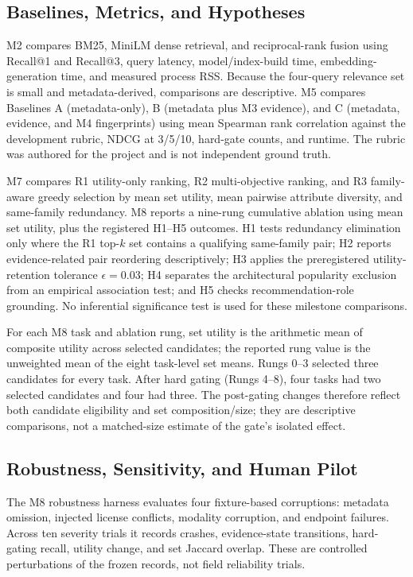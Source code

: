 \documentclass[conference]{IEEEtran}
\begin{document}
\subsection{Baselines, Metrics, and Hypotheses}
M2 compares BM25, MiniLM dense retrieval, and reciprocal-rank fusion using Recall@1 and Recall@3, query latency, model/index-build time, embedding-generation time, and measured process RSS. Because the four-query relevance set is small and metadata-derived, comparisons are descriptive. M5 compares Baselines A (metadata-only), B (metadata plus M3 evidence), and C (metadata, evidence, and M4 fingerprints) using mean Spearman rank correlation against the development rubric, NDCG at 3/5/10, hard-gate counts, and runtime. The rubric was authored for the project and is not independent ground truth.

M7 compares R1 utility-only ranking, R2 multi-objective ranking, and R3 family-aware greedy selection by mean set utility, mean pairwise attribute diversity, and same-family redundancy. M8 reports a nine-rung cumulative ablation using mean set utility, plus the registered H1--H5 outcomes. H1 tests redundancy elimination only where the R1 top-$k$ set contains a qualifying same-family pair; H2 reports evidence-related pair reordering descriptively; H3 applies the preregistered utility-retention tolerance $\epsilon=0.03$; H4 separates the architectural popularity exclusion from an empirical association test; and H5 checks recommendation-role grounding. No inferential significance test is used for these milestone comparisons.

For each M8 task and ablation rung, set utility is the arithmetic mean of composite utility across selected candidates; the reported rung value is the unweighted mean of the eight task-level set means. Rungs 0--3 selected three candidates for every task. After hard gating (Rungs 4--8), four tasks had two selected candidates and four had three. The post-gating changes therefore reflect both candidate eligibility and set composition/size; they are descriptive comparisons, not a matched-size estimate of the gate's isolated effect.

\subsection{Robustness, Sensitivity, and Human Pilot}
The M8 robustness harness evaluates four fixture-based corruptions: metadata omission, injected license conflicts, modality corruption, and endpoint failures. Across ten severity trials it records crashes, evidence-state transitions, hard-gating recall, utility change, and set Jaccard overlap. These are controlled perturbations of the frozen records, not field reliability trials.
\end{document}
